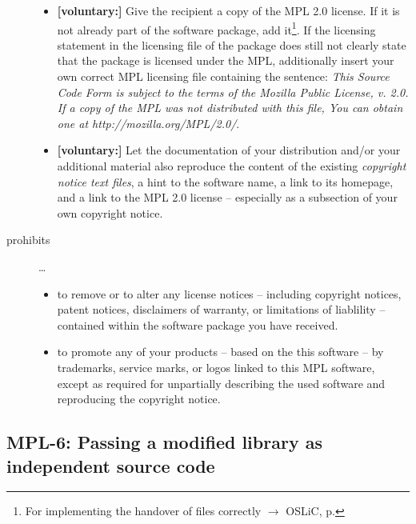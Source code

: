 \begin{description}
\begin{itemize}
  \item \textbf{[voluntary:]} Give the recipient a copy of the MPL 2.0 license.
  If it is not already part of the software package, add it\footnote{For
  implementing the handover of files correctly $\rightarrow$ OSLiC, p.
  \pageref{DistributingFilesHint}}. If the licensing statement in the licensing
  file of the package does still not clearly state that the package is licensed
  under the MPL, additionally insert your own correct MPL licensing file
  containing the sentence: \emph{This Source Code Form is subject to the terms
  of the Mozilla Public License, v. 2.0. If a copy of the MPL was not
  distributed with this file, You can obtain one at
  http://mozilla.org/MPL/2.0/}.
 
  \item \textbf{[voluntary:]} Let the documentation of your distribution and/or
  your additional material  also reproduce the content of the existing
  \emph{copyright notice text files}, a hint to the software name, a link to its
  homepage, and a link to the MPL 2.0 license -- especially as a subsection of
  your own copyright notice.

\end{itemize}  

\item[prohibits] \ldots
\begin{itemize}
  \item to remove or to alter any license notices -- including copyright
  notices, patent notices, disclaimers of warranty, or limitations of liablility
  -- contained within the software package you have received.
  \item to promote any of your products -- based on the this software -- by
  trademarks, service marks, or logos linked to this MPL software, except as
  required for unpartially describing the used software and reproducing the
  copyright notice.
\end{itemize}

\end{description}

\subsection{MPL-6: Passing a modified library as independent source code}
\label{OSUC-08S-MPL}

